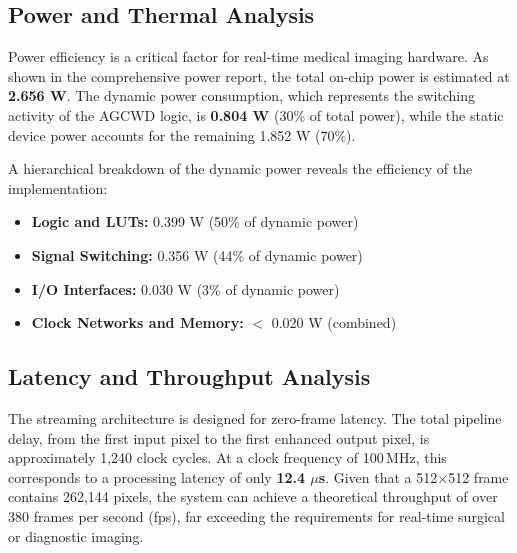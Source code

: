 \documentclass[conference]{IEEEtran}
\begin{document}
\begin{table}[htbp]
\caption{Hardware Resource Utilization Summary}
\begin{center}
\label{tab:resources}
\end{center}
\end{table}

\subsection{Power and Thermal Analysis}
Power efficiency is a critical factor for real-time medical imaging hardware. As shown in the comprehensive power report, the total on-chip power is estimated at \textbf{2.656 W}. The dynamic power consumption, which represents the switching activity of the AGCWD logic, is \textbf{0.804 W} (30\% of total power), while the static device power accounts for the remaining 1.852 W (70\%).

A hierarchical breakdown of the dynamic power reveals the efficiency of the implementation:
\begin{itemize}
    \item \textbf{Logic and LUTs:} 0.399 W (50\% of dynamic power)
    \item \textbf{Signal Switching:} 0.356 W (44\% of dynamic power)
    \item \textbf{I/O Interfaces:} 0.030 W (3\% of dynamic power)
    \item \textbf{Clock Networks and Memory:} $<$ 0.020 W (combined)
\end{itemize}

\subsection{Latency and Throughput Analysis}
The streaming architecture is designed for zero-frame latency. The total pipeline delay, from the first input pixel to the first enhanced output pixel, is approximately 1,240 clock cycles. At a clock frequency of 100\,MHz, this corresponds to a processing latency of only \textbf{12.4 $\mu$s}. Given that a 512$\times$512 frame contains 262,144 pixels, the system can achieve a theoretical throughput of over 380 frames per second (fps), far exceeding the requirements for real-time surgical or diagnostic imaging.
\end{document}

